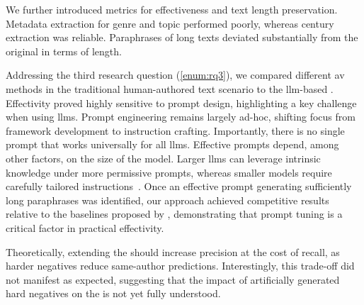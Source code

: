 We further introduced metrics for \pextractor{} effectiveness and text length preservation. 
Metadata extraction for genre and topic performed poorly, whereas century extraction was reliable. 
Paraphrases of long \dataGutenberg{} texts deviated substantially from the original in terms of length.  


Addressing the third research question (\ref{enum:rq3}), we compared different \ac{av} methods in the traditional human-authored text scenario 
to the \ac{llm}-based \impAppr{}.
Effectivity proved highly sensitive to prompt design, highlighting a key challenge when using \acp{llm}. 
Prompt engineering remains largely ad-hoc, shifting focus from framework development to instruction crafting. 
Importantly, there is no single prompt that works universally for all \acp{llm}. 
Effective prompts depend, among other factors, on the size of the model. 
Larger \acp{llm} can leverage intrinsic knowledge under more permissive prompts, whereas smaller models require carefully tailored instructions~\citep{schmidt_llm_av_latin_24}.
Once an effective prompt generating sufficiently long paraphrases was identified, our approach achieved competitive results relative to the baselines proposed by \citet{koppel_determining_2014}, demonstrating that prompt tuning is a critical factor in practical effectivity.

Theoretically, extending the \impAppr{} should increase precision at the cost of recall, as harder negatives reduce same-author predictions. 
Interestingly, this trade-off did not manifest as expected, suggesting that the impact of artificially generated hard negatives on the \impAppr{} is not yet fully understood.